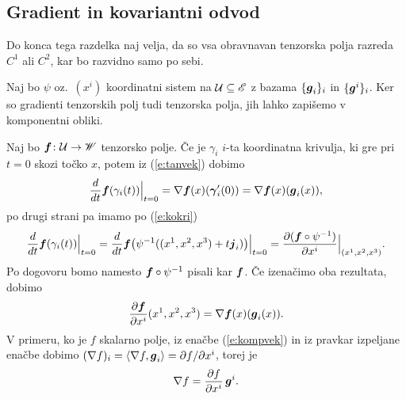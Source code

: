 \subsection{Gradient in kovariantni odvod}


Do konca tega razdelka naj velja, da so vsa obravnavan tenzorska polja razreda
$C^{1}$ ali $C^{2}$, kar bo razvidno samo po sebi.

Naj bo $\psi$ oz.~$(x^i)$ koordinatni sistem na $\mathcal U\subseteq\mathscr E$ z bazama $\{\boldsymbol g_i\}_i$ in $\{\boldsymbol g^i\}_i$.
Ker so gradienti tenzorskih polj tudi tenzorska polja, jih lahko zapišemo v komponentni obliki.

Naj bo $\boldsymbol f\colon \mathcal U\to\mathscr W$ tenzorsko polje. Če je $\gamma_i$ $i$-ta
koordinatna krivulja, ki gre pri $t=0$ skozi točko $x$, potem iz (\ref{e:tanvek}) dobimo
\begin{equation*}
	\frac{d}{dt}\boldsymbol f(\gamma_i(t))\Big|_{t=0}=
	\nabla \boldsymbol f(x)(\boldsymbol \gamma_i'(0))=\nabla \boldsymbol f(x)(\boldsymbol g_i(x)),
\end{equation*}
po drugi strani pa imamo po (\ref{e:kokri})
\begin{equation*}
	\frac{d}{dt}\boldsymbol f(\gamma_i(t))\Big|_{t=0}=
	\frac{d}{dt}\boldsymbol f\big(\psi^{-1}((x^1,x^2,x^3)+t\boldsymbol j_i)\big)\Big|_{t=0}=
	\frac{\partial(\boldsymbol f\circ\psi^{-1})}{\partial x^i}\Big|_{(x^1,x^2,x^3)}.
\end{equation*}
Po dogovoru bomo namesto $\boldsymbol f\circ\psi^{-1}$ pisali kar $\boldsymbol f$. Če izenačimo oba rezultata, dobimo
\begin{equation} \label{e:sotf}
	\frac{\partial\boldsymbol f}{\partial x^i}(x^1,x^2,x^3)=\nabla \boldsymbol f(x)(\boldsymbol g_i(x)).
\end{equation}
V primeru, ko je $f$ skalarno polje, iz enačbe (\ref{e:kompvek}) in iz pravkar izpeljane enačbe
dobimo $(\nabla f)_i=\langle\nabla f,\boldsymbol g_i\rangle=\partial f/\partial x^i$, torej je
\begin{equation} \label{e:gradskal}
	\nabla f = \frac{\partial f}{\partial x^i}\,\boldsymbol g^i.
\end{equation}

